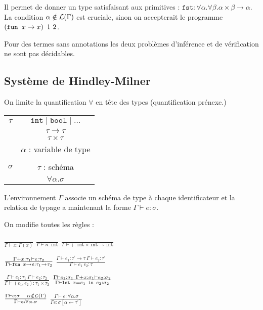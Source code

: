 \documentclass{cours}
\begin{document}
Il permet de donner un type satisfaisant aux primitives : $\texttt{fst} : \forall\alpha.\forall\beta.\alpha\times\beta \rightarrow \alpha$.
La condition $\alpha \notin \mathcal{L}(\Gamma)$ est cruciale, sinon on accepterait le programme $\left(\texttt{fun } x \rightarrow x\right)\ 1 \ 2$.

Pour des termes sans annotations les deux problèmes d'inférence et de vérification ne sont pas décidables.

\subsection{Système de Hindley-Milner}
On limite la quantification $\forall$ en tête des types (quantification prénexe.)
\begin{tabular}{c@{$\mid$}c}
    $\tau$   & $\texttt{int} \mid \texttt{bool} \mid \ldots$ \\
             & $\tau \rightarrow \tau$                       \\
             & $\tau \times \tau$                            \\
             & $\alpha$ : variable de type                   \\
             &                                               \\
    $\sigma$ & $\tau$ : schéma                               \\
             & $\forall\alpha.\sigma$
\end{tabular}
L'environnement $\Gamma$ associe un schéma de type à chaque identificateur et la relation de typage a maintenant la forme $\Gamma \vdash e : \sigma$.

On modifie toutes les règles :
\begin{center}
    $\frac{}{\Gamma \vdash x : \Gamma(x)}$
    $\frac{}{\Gamma \vdash n : \texttt{int}}$
    $\frac{}{\Gamma \vdash + : \texttt{int} \times \texttt{int} \rightarrow \texttt{int}}$
\end{center}
\begin{center}
    $\frac{\Gamma + x : \tau_{1} \vdash e : \tau_{2}}{\Gamma \vdash \texttt{fun } x \rightarrow e:\tau_{1}\rightarrow\tau_{2}}$
    $\frac{\Gamma \vdash e_{1} : \tau^{'}\rightarrow\tau \ \Gamma \vdash e_{2} : \tau^{'}}{\Gamma \vdash e_{1}\ e_{2} : \tau}$
\end{center}
\begin{center}
    $\frac{\Gamma \vdash e_{1} : \tau_{1} \ \Gamma \vdash e_{2} : \tau_{2}}{\Gamma \vdash (e_{1},e_{2}) : \tau_{1} \times \tau_{2}}$
    $\frac{\Gamma \vdash e_{1} : \sigma_{1} \ \Gamma + x : \sigma_{1} \vdash e_{2} : \sigma_{2}}{\Gamma \vdash \letin{x = e_{1}} e_{2} : \sigma_{2}}$
\end{center}
\begin{center}
    $\frac{\Gamma \vdash e : \sigma \ \ \ \alpha \notin \mL(\Gamma)}{\Gamma \vdash e : \forall\alpha.\sigma}$
    $\frac{\Gamma \vdash e : \forall\alpha.\sigma}{\Gamma e : \sigma\left[\alpha \leftarrow \tau^{'}\right]}$
\end{center}
\end{document}
